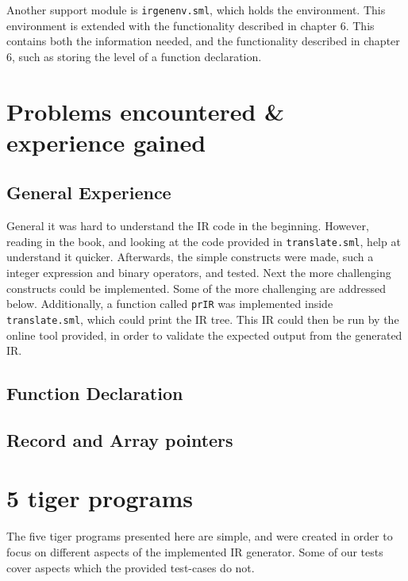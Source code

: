 \documentclass{article}
\begin{document}

Another support module is \texttt{irgenenv.sml}, which holds the environment. This environment is extended with the functionality described in chapter 6. This contains both the information needed, and the functionality described in chapter 6, such as storing the level of a function declaration.

\section{Problems encountered \& experience gained}

\subsection{General Experience}
General it was hard to understand the IR code in the beginning. However, reading in the book, and looking at the code provided in \texttt{translate.sml}, help at understand it quicker. Afterwards, the simple constructs were made, such a integer expression and binary operators, and tested. Next the more challenging constructs could be implemented. Some of the more challenging are addressed below. Additionally, a function called \texttt{prIR} was implemented inside \texttt{translate.sml}, which could print the IR tree. This IR could then be run by the online tool provided, in order to validate the expected output from the generated IR. 


\subsection{Function Declaration}

\subsection{Record and Array pointers}

\section{5 tiger programs}

The five tiger programs presented here are simple, and were created in order to focus on different aspects of the implemented IR generator. Some of our tests cover aspects which the provided test-cases do not.
\end{document}
